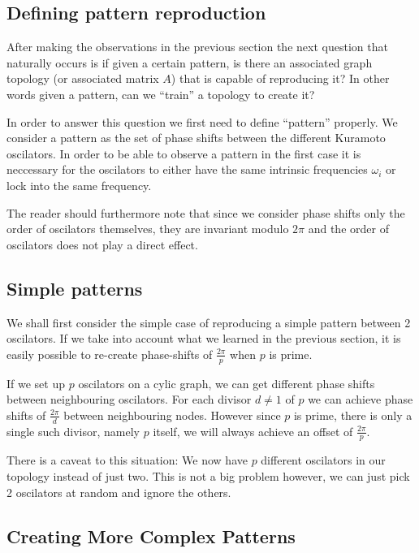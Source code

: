 \label{sec:patterns}

\subsection{Defining pattern reproduction}

After making the observations in the previous section the next question that naturally occurs is if given a certain pattern, is there an associated graph topology (or associated matrix $A$) that is capable of reproducing it? In other words given a pattern, can we ``train'' a topology to create it?

In order to answer this question we first need to define ``pattern'' properly. We consider a pattern as the set of phase shifts between the different Kuramoto oscilators. In order to be able to observe a pattern in the first case it is neccessary for the oscilators to either have the same intrinsic frequencies $\omega_i$ or lock into the same frequency. 

The reader should furthermore note that since we consider phase shifts only the order of oscilators themselves, they are invariant modulo $2\pi$ and the order of oscilators does not play a direct effect. 

\subsection{Simple patterns}

We shall first consider the simple case of reproducing a simple pattern between 2 oscilators. If we take into account what we learned in the previous section, it is easily possible to re-create phase-shifts of $\frac{2\pi}{p}$ when $p$ is prime. 

If we set up $p$ oscilators on a cylic graph, we can get different phase shifts between neighbouring oscilators. For each divisor $d \neq 1$ of $p$ we can achieve phase shifts of $\frac{2\pi}{d}$ between neighbouring nodes. However since $p$ is prime, there is only a single such divisor, namely $p$ itself, we will always achieve an offset of $\frac{2\pi}{p}$. 

There is a caveat to this situation: We now have $p$ different oscilators in our topology instead of just two. This is not a big problem however, we can just pick 2 oscilators at random and ignore the others. 

\subsection{Creating More Complex Patterns}

